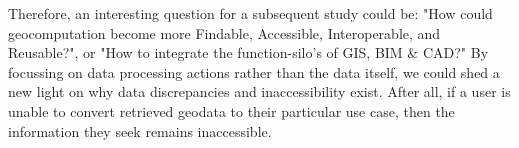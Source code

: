 Therefore, an interesting question for a subsequent study could be: "How could geocomputation become more Findable, Accessible, Interoperable, and Reusable?", or "How to integrate the function-silo's of GIS, BIM \& CAD?"
By focussing on data processing actions rather than the data itself, we could shed a new light on why data discrepancies and inaccessibility exist. 
After all, if a user is unable to convert retrieved geodata to their particular use case, then the information they seek remains inaccessible.







  



